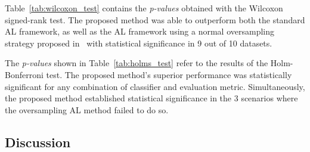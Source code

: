 \documentclass[parskip=full]{scrartcl}
\begin{document}
Table~\ref{tab:wilcoxon_test} contains the \textit{p-values} obtained with the
Wilcoxon signed-rank test. The proposed method was able to outperform both the
standard AL framework, as well as the AL framework using a normal oversampling
strategy proposed in~\cite{Fonseca2021} with statistical significance in 9 out
of 10 datasets.

\begin{table}[H]
	\centering
    \caption{%
        Adjusted p-values using the Wilcoxon signed-rank method. Bold values
        are statistically significant at a level of $\alpha = 0.05$. The null
        hypothesis is that the performance of the proposed framework is
        similar to that of the oversampling or standard framework.
    }\label{tab:wilcoxon_test}
\end{table}

The \textit{p-values} shown in Table~\ref{tab:holms_test} refer to the results
of the Holm-Bonferroni test. The proposed method's superior performance was
statistically significant for any combination of classifier and evaluation
metric. Simultaneously, the proposed method established statistical
significance in the 3 scenarios where the oversampling AL method failed to do
so.

\begin{table}[H]
	\centering
    \caption{%
        Adjusted p-values using the Holm-Bonferroni method. Bold values are
        statistically significant at a level of $\alpha = 0.05$. The null
        hypothesis is that the Oversampling or Proposed method does not
        perform better than the control method (Standard AL framework).
    }\label{tab:holms_test}
\end{table}




\subsection{Discussion}~\label{sec:sub_discussion}
\end{document}
